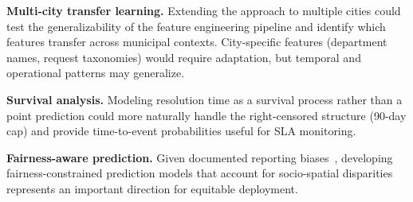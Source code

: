 \documentclass[sigconf,nonacm]{acmart}
\begin{document}
\textbf{Multi-city transfer learning.} Extending the approach to
multiple cities could test the generalizability of the feature
engineering pipeline and identify which features transfer across
municipal contexts. City-specific features (department names,
request taxonomies) would require adaptation, but temporal and
operational patterns may generalize.

\textbf{Survival analysis.} Modeling resolution time as a
survival process rather than a point prediction could more
naturally handle the right-censored structure (90-day cap) and
provide time-to-event probabilities useful for SLA monitoring.

\textbf{Fairness-aware prediction.} Given documented reporting
biases~\cite{kontokosta2021bias}, developing fairness-constrained
prediction models that account for socio-spatial disparities
represents an important direction for equitable deployment.

\balance


\end{document}
